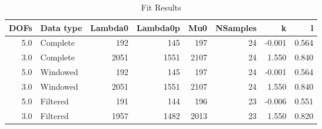 \begin{table}
\centering
\caption{Fit Results}
\begin{tabular}{rlrrrrrr}
\toprule
 DOFs & Data type &  Lambda0 &  Lambda0p &   Mu0 &  NSamples &      k &      l \\
\midrule
  5.0 &  Complete &      192 &       145 &   197 &        24 & -0.001 &  0.564 \\
  3.0 &  Complete &     2051 &      1551 &  2107 &        24 &  1.550 &  0.840 \\
  5.0 &  Windowed &      192 &       145 &   197 &        24 & -0.001 &  0.564 \\
  3.0 &  Windowed &     2051 &      1551 &  2107 &        24 &  1.550 &  0.840 \\
  5.0 &  Filtered &      191 &       144 &   196 &        23 & -0.006 &  0.551 \\
  3.0 &  Filtered &     1957 &      1482 &  2013 &        23 &  1.550 &  0.820 \\
\bottomrule
\end{tabular}
\end{table}
